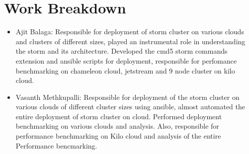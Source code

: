\documentclass[9pt,twocolumn,twoside]{../../styles/osajnl}
\begin{document}


\appendix

\section{Work Breakdown}
\begin{itemize}
\item Ajit Balaga: Responsible for deployment of storm cluster on
  various clouds and clusters of different sizes, played an
  instrumental role in understanding the storm and its
  architecture. Developed the cmd5 storm commands extension and
  ansible scripts for deployment, responsible for perfomance
  benchmarking on chameleon cloud, jetstream and 9 node cluster on
  kilo cloud.
\item Vasanth Methkupalli: Responsible for deployment of the storm
  cluster on various clouds of different cluster sizes using ansible,
  almost automated the entire deployment of storm cluster on
  cloud. Performed deployment benchmarking on various clouds and
  analysis. Also, responsible for performance benchmarking on Kilo
  cloud and analysis of the entire Performance bencmarking.
\end{itemize}

\listoffigures
\listoftables
\end{document}
